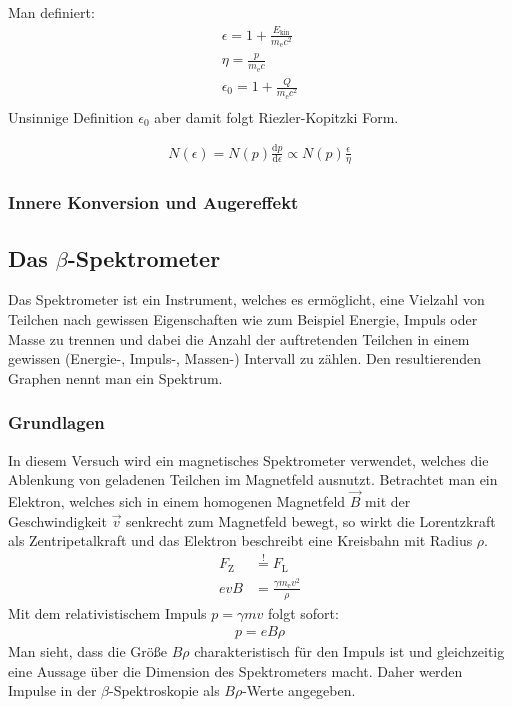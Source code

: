 \documentclass[11pt, a4paper]{article}
\numberwithin{equation}{section}
\begin{document}
Man definiert:
\begin{align}
	\epsilon = 1 + \frac{E_\mathrm{kin}}{m_\mathrm{e} c^2} \\
	\eta = \frac{p}{m_\mathrm{e} c} \\
	\epsilon_0 = 1 + \frac{Q}{m_\mathrm{e} c^2} \\
\end{align}
Unsinnige Definition $\epsilon_0$ aber damit folgt Riezler-Kopitzki Form.

\begin{align}
	N(\epsilon) = N(p) \frac{\mathrm{d}p}{\mathrm{d}\epsilon}\propto N(p) \frac{\epsilon}{\eta}
\end{align}

\subsubsection{Innere Konversion und Augereffekt}

\subsection{Das $\beta$-Spektrometer}
Das Spektrometer ist ein Instrument, welches es ermöglicht, eine Vielzahl von Teilchen nach gewissen Eigenschaften wie zum Beispiel Energie, Impuls oder Masse zu trennen und dabei die Anzahl der auftretenden Teilchen in einem gewissen (Energie-, Impuls-, Massen-) Intervall zu zählen.
Den resultierenden Graphen nennt man ein Spektrum.

\subsubsection{Grundlagen}
In diesem Versuch wird ein magnetisches Spektrometer verwendet, welches die Ablenkung von geladenen Teilchen im Magnetfeld ausnutzt.
Betrachtet man ein Elektron, welches sich in einem homogenen Magnetfeld $\vec{B}$ mit der Geschwindigkeit $\vec{v}$ senkrecht zum Magnetfeld bewegt, so wirkt die Lorentzkraft als Zentripetalkraft und das Elektron beschreibt eine Kreisbahn mit Radius $\rho$.
\begin{align}
	F_\mathrm{Z} &\stackrel{!}{=} F_\mathrm{L} \nonumber\\
	e v B &= \frac{\gamma m_\mathrm{e} v^2}{\rho}
\end{align}
Mit dem relativistischem Impuls $p = \gamma m v$ folgt sofort:
\begin{align}
	p = e B \rho
	\label{eq:impuls_radius}
\end{align}
Man sieht, dass die Größe $B \rho$ charakteristisch für den Impuls ist und gleichzeitig eine Aussage über die Dimension des Spektrometers macht.
Daher werden Impulse in der $\beta$-Spektroskopie als $B \rho$-Werte angegeben.
\end{document}
